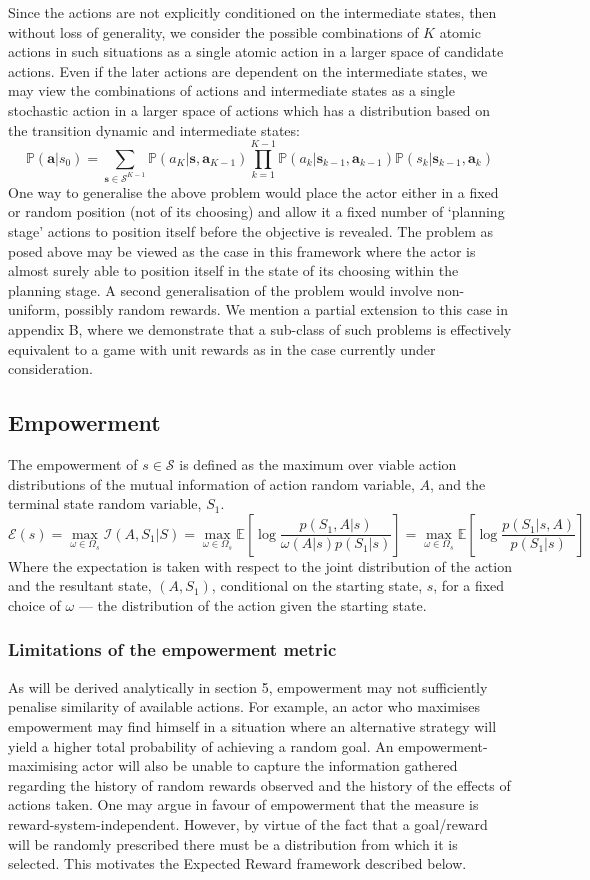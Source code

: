 \documentclass{article}
\newcommand{\EE}{\mathbb{E}}
\newcommand{\PP}{\mathbb{P}}
\newcommand{\Ss}{\mathcal{S}}
\newcommand{\Ii}{\mathcal{I}}
\newcommand{\Ee}{\mathcal{E}}
\begin{document}
Since the actions are not explicitly conditioned on the intermediate states, then without loss of generality, we consider the possible combinations of $K$ atomic actions in such situations as a single atomic action in a larger space of candidate actions.
Even if the later actions are dependent on the intermediate states, we may view the combinations of actions and intermediate states as a single stochastic action in a larger space of actions which has a distribution based on the transition dynamic and intermediate states:
\[\PP(\mathbf{a}|s_0) = \sum_{\mathbf{s}\in \Ss^{K-1}} \PP(a_K|\mathbf{s},\mathbf{a}_{K-1}) \prod_{k=1}^{K-1} \PP(a_k|\mathbf{s}_{k-1},\mathbf{a}_{k-1})\PP(s_{k}|\mathbf{s}_{k-1},\mathbf{a}_k)\]
One way to generalise the above problem would place the actor either in a fixed or random position (not of its choosing) and allow it a fixed number of `planning stage' actions to position itself before the objective is revealed. 
The problem as posed above may be viewed as the case in this framework where the actor is almost surely able to position itself in the state of its choosing within the planning stage.
A second generalisation of the problem would involve non-uniform, possibly random rewards. We mention a partial extension to this case in appendix B, where we demonstrate that a sub-class of such problems is effectively equivalent to a game with unit rewards as in the case currently under consideration. 

\subsection{Empowerment}
The empowerment of $s\in\mathcal{S}$ is defined as the maximum over viable action distributions of the mutual information of action random variable, $A$, and the terminal state random variable, $S_1$.
\[\Ee(s)=\max_{\omega\in\Omega_s}\Ii(A,S_1|S)=\max_{\omega\in\Omega_s}\EE\left[\log\frac{p(S_1,A|s)}{\omega(A|s)p(S_1|s)}\right]=\max_{\omega\in\Omega_s}\EE\left[\log\frac{p(S_1|s,A)}{p(S_1|s)}\right] \]
Where the expectation is taken with respect to the joint distribution of the action and the resultant state, $(A,S_1)$, conditional on the starting state, $s$, for a fixed choice of $\omega$ --- the distribution of the action given the starting state. 

\subsubsection{Limitations of the empowerment metric}
As will be derived analytically in section 5, empowerment may not sufficiently penalise similarity of available actions.
For example, an actor who maximises empowerment may find himself in a situation where an alternative strategy will yield a higher total probability of achieving a random goal.
An empowerment-maximising actor will also be unable to capture the information gathered regarding the history of random rewards observed and the history of the effects of actions taken.
One may argue in favour of empowerment that the measure is reward-system-independent.
However, by virtue of the fact that a goal/reward will be randomly prescribed there must be a distribution from which it is selected. This motivates the Expected Reward framework described below.
\end{document}
